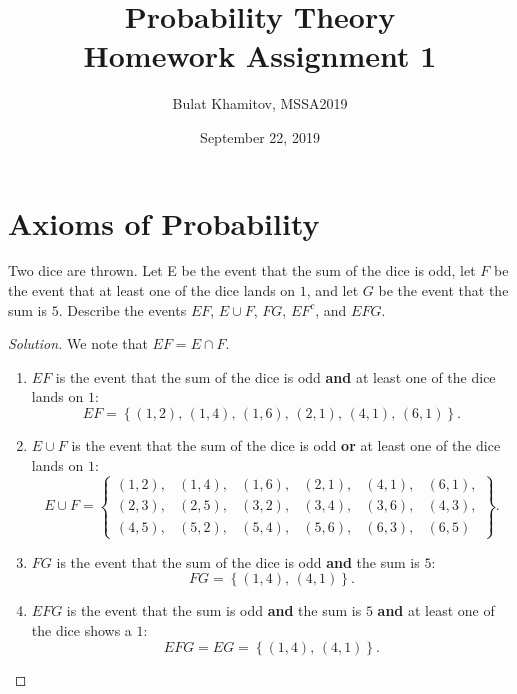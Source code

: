 \documentclass{article}[12pt]
\title{Probability Theory \\ Homework Assignment 1}
\author{Bulat Khamitov, MSSA2019}
\date{September 22, 2019}
\newenvironment{solution}
  {\renewcommand\qedsymbol{$\blacksquare$}\begin{proof}[Solution]}
  {\end{proof}}
\newenvironment{problem}[1]
  {\renewcommand\theinnercustomprblm{#1}\innercustomprblm}
  {\endinnercustomprblm}
\begin{document}
\maketitle

\section{Axioms of Probability}

\begin{problem}{3}\normalfont
Two dice are thrown.
Let E be the event that the sum of the dice is odd, let $F$ be the event that at least one of the dice lands on $1$, and let $G$ be the event that the sum is $5$.
Describe the events $EF$, $E\cup F$, $FG$, $EF^{c}$, and $EFG$.
\end{problem}

\begin{solution}
We note that $EF = E \cap F$.
\begin{enumerate}
    \item $EF$ is the event that the sum of the dice is odd \textbf{and} at least one of the dice lands on $1$:
    \begin{equation*}
        EF = \left\{(1, 2),\, (1, 4),\, (1, 6),\, (2, 1),\, (4, 1),\, (6, 1)\right\}.
    \end{equation*}

    \item $E\cup F$ is the event that the sum of the dice is odd \textbf{or} at least one of the dice lands on $1$:
    \begin{equation*}
        E\cup F =
        \begin{Bmatrix}
        (1, 2), & (1, 4), & (1, 6), & (2, 1), & (4, 1), & (6, 1),
        \\
        (2, 3), & (2, 5), & (3, 2), & (3, 4), & (3, 6), & (4, 3),
        \\
        (4, 5), & (5, 2), & (5, 4), & (5, 6), & (6, 3), & (6, 5)
        \end{Bmatrix}.
    \end{equation*}

    \item $FG$ is the event that the sum of the dice is odd \textbf{and} the sum is $5$:
    \begin{equation*}
        FG = \left\{(1, 4),\, (4, 1)\right\}.
    \end{equation*}

    \item $EFG$ is the event that the sum is odd \textbf{and} the sum is $5$ \textbf{and} at least one of the dice shows a $1$:
    \begin{equation*}
        EFG = EG = \left\{(1, 4),\, (4, 1)\right\}.
    \end{equation*}


\end{enumerate}
\end{solution}
\end{document}

